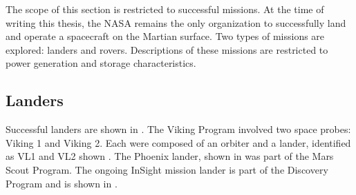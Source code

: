 
The scope of this section is restricted to successful missions. At the time of writing this thesis, the \ac{NASA} remains the only organization to successfully land and operate a spacecraft on the Martian surface. Two types of missions are explored: landers and rovers. Descriptions of these missions are restricted to power generation and storage characteristics.

\subsection{Landers}
\label{sec:StateOfTheArt:PastAndOngoingMissions:Landers}

Successful landers are shown in . The Viking Program involved two space probes: Viking 1 and Viking 2. Each were composed of an orbiter and a lander, identified as \ac{VL1} and \ac{VL2} shown . The Phoenix lander, shown in  was part of the Mars Scout Program. The ongoing InSight mission lander is part of the Discovery Program and is shown in .

\vspace{0.5cm}

